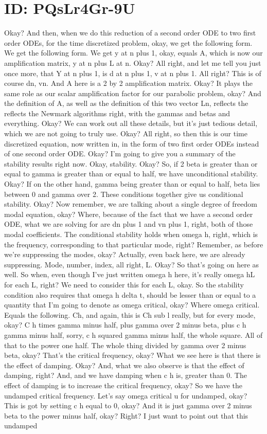 \documentclass[10pt]{article}
\begin{document}
\section*{ID: PQsLr4Gr-9U}
Okay? And then, when we do this reduction of a second order ODE to two first order ODEs, for the time discretized problem, okay, we get the following form. We get the following form. We get y at n plus 1, okay, equals A, which is now our amplification matrix, y at n plus L at n. Okay? All right, and let me tell you just once more, that Y at n plus 1, is d at n plus 1, v at n plus 1. All right? This is of course dn, vn. And A here is a 2 by 2 amplification matrix. Okay? It plays the same role as our scalar amplification factor for our parabolic problem, okay? And the definition of A, as well as the definition of this two vector Ln, reflects the reflects the Newmark algorithms right, with the gammas and betas and everything. Okay? We can work out all these details, but it's just tedious detail, which we are not going to truly use. Okay? All right, so then this is our time discretized equation, now written in, in the form of two first order ODEs instead of one second order ODE. Okay? I'm going to give you a summary of the stability results right now. Okay, stability. Okay? So, if 2 beta is greater than or equal to gamma is greater than or equal to half, we have unconditional stability. Okay? If on the other hand, gamma being greater than or equal to half, beta lies between 0 and gamma over 2. These conditions together give us conditional stability. Okay? Now remember, we are talking about a single degree of freedom modal equation, okay? Where, because of the fact that we have a second order ODE, what we are solving for are dn plus 1 and vn plus 1, right, both of those modal coefficients. The conditional stability holds when omega h, right, which is the frequency, corresponding to that particular mode, right? Remember, as before we're suppressing the modes, okay? Actually, even back here, we are already suppressing. Mode, number, index, all right, L. Okay? So that's going on here as well. So when, even though I've just written omega h here, it's really omega hL for each L, right? We need to consider this for each L, okay. So the stability condition also requires that omega h delta t, should be lesser than or equal to a quantity that I'm going to denote as omega critical, okay? Where omega critical. Equals the following. Ch, and again, this is Ch sub l really, but for every mode, okay? C h times gamma minus half, plus gamma over 2 minus beta, plus c h gamma minus half, sorry, c h squared gamma minus half, the whole square. All of that to the power one half. The whole thing divided by gamma over 2 minus beta, okay? That's the critical frequency, okay? What we see here is that there is the effect of damping. Okay? And, what we also observe is that the effect of damping, right? And, and we have damping when c h is, greater than 0. The effect of damping is to increase the critical frequency, okay? So we have the undamped critical frequency. Let's say omega critical u for undamped, okay? This is got by setting c h equal to 0, okay? And it is just gamma over 2 minus beta to the power minus half, okay? Right? I just want to point out that this undamped 
\end{document}
